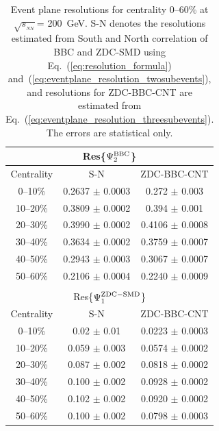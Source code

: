 \documentclass[aps,prc,superscriptaddress,showpacs,floatfix,twocolumn]{revtex4}
\newcommand \sqsn{\mbox{$\sqrt{s_{_{NN}}}$}\xspace}
\begin{document}
\begin{table}[htbp]
\caption{\label{tab:summary_eventplane_resolution}
Event plane resolutions for centrality 0--60\% at \sqsn = 200~GeV. 
S-N denotes the resolutions estimated from South and North 
correlation of BBC and ZDC-SMD using 
Eq.~(\ref{eq:resolution_formula}) 
and~(\ref{eq:eventplane_resolution_twosubevents}), and 
resolutions for ZDC-BBC-CNT are estimated from 
Eq.~(\ref{eq:eventplane_resolution_threesubevents}). The errors 
are statistical only.
}
\begin{ruledtabular} \begin{tabular}{ccc}
\multicolumn{3}{c}{Res\{$\Psi_2^{\rm BBC}$\}} \\  \hline
 Centrality   &  S-N & ZDC-BBC-CNT \\ \hline
  0--10\%  & 0.2637 $\pm$ 0.0003 & 0.272  $\pm$ 0.003  \\
 10--20\%  & 0.3809 $\pm$ 0.0002 & 0.394  $\pm$ 0.001  \\
 20--30\%  & 0.3990 $\pm$ 0.0002 & 0.4106 $\pm$ 0.0008 \\
 30--40\%  & 0.3634 $\pm$ 0.0002 & 0.3759 $\pm$ 0.0007 \\
 40--50\%  & 0.2943 $\pm$ 0.0003 & 0.3067 $\pm$ 0.0007 \\
 50--60\%  & 0.2106 $\pm$ 0.0004 & 0.2240 $\pm$ 0.0009 \\
\hline
 & & \\
\multicolumn{3}{c}{Res\{$\Psi_1^{\rm ZDC-SMD}$\}} \\ \hline
 Centrality   &  S-N & ZDC-BBC-CNT \\ \hline
  0--10\%  & 0.02  $\pm$ 0.01  & 0.0223 $\pm$ 0.0003  \\
 10--20\%  & 0.059 $\pm$ 0.003 & 0.0574 $\pm$ 0.0002  \\
 20--30\%  & 0.087 $\pm$ 0.002 & 0.0818 $\pm$ 0.0002  \\
 30--40\%  & 0.100 $\pm$ 0.002 & 0.0928 $\pm$ 0.0002  \\
 40--50\%  & 0.102 $\pm$ 0.002 & 0.0920 $\pm$ 0.0002  \\
 50--60\%  & 0.100 $\pm$ 0.002 & 0.0798 $\pm$ 0.0003  \\
\end{tabular}\end{ruledtabular}
\end{table}
\end{document}
